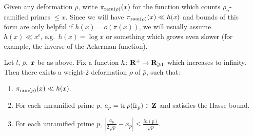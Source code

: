 Given any deformation $\rho$, write $\pi_{\mathrm{ram}(\rho)}(x)$ for the function 
which counts $\rho_n$-ramified primes $\leqslant x$. Since we will have 
$\pi_{\mathrm{ram}(\rho)}(x)\ll h(x)$ and bounds of this form are only helpful 
if $h(x) = o(\pi(x))$, we will usually assume $h(x) \ll x^\epsilon$, 
e.g.~$h(x) = \log x$ or something which grows even slower (for example, the 
inverse of the Ackerman function). 

\begin{theorem}\label{thm:master-Galois}
Let $l$, $\bar\rho$, ${\boldsymbol x}$ be as above. Fix a function 
$h\colon \mathbf{R}^+ \to \mathbf{R}_{\geqslant 1}$ which increases to infinity. Then there 
exists a weight-$2$ deformation $\rho$ of $\bar\rho$, such that: 
\begin{enumerate}
\item
$\pi_{\mathrm{ram}(\rho)}(x) \ll h(x)$. 

\item
For each unramified prime $p$, $a_p=\operatorname{tr}\rho(\mathrm{fr}_p)\in \mathbf{Z}$ and satisfies the 
Hasse bound. 

\item
For each unramified prime $p$, 
$\left| \frac{a_p}{2\sqrt p} - x_p\right| \leqslant \frac{l h(p)}{\sqrt p}$. 
\end{enumerate}
\end{theorem}
